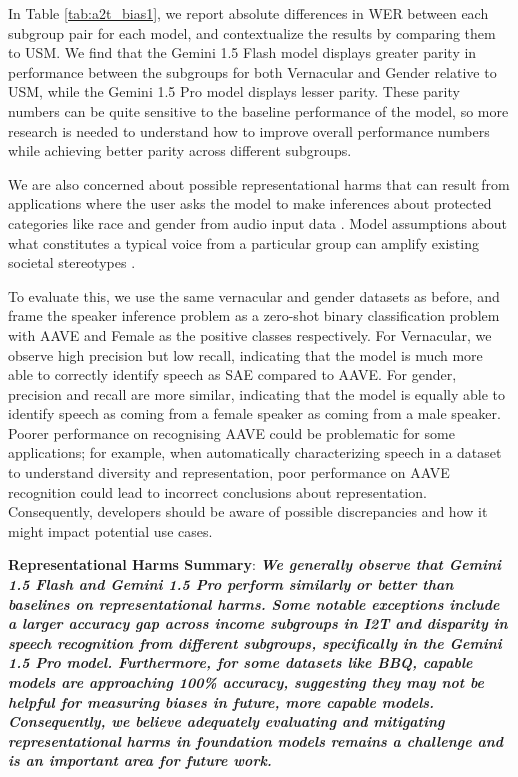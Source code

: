 In Table \ref{tab:a2t_bias1}, we report absolute differences in WER between each subgroup pair for each model, and contextualize the results by comparing them to USM. We find that the Gemini 1.5 Flash model displays greater parity in performance between the subgroups for both Vernacular and Gender relative to USM, while the Gemini 1.5 Pro model displays lesser parity. These parity numbers can be quite sensitive to the baseline performance of the model, so more research is needed to understand how to improve overall performance numbers while achieving better parity across different subgroups.

We are also concerned about possible representational harms that can result from applications where the user asks the model to make inferences about protected categories like race and gender from audio input data \citep{weidinger2021ethical}. Model assumptions about what constitutes a typical voice from a particular group can amplify existing societal stereotypes \citep{buolamwini2018gender}.

To evaluate this, we use the same vernacular and gender datasets as before, and frame the speaker inference problem as a zero-shot binary classification problem with AAVE and Female as the positive classes respectively. For Vernacular, we observe high precision but low recall, indicating that the model is much more able to correctly identify speech as SAE compared to AAVE. For gender, precision and recall are more similar, indicating that the model is equally able to identify speech as coming from a female speaker as coming from a male speaker.  Poorer performance on recognising AAVE could be problematic for some applications; for example, when automatically characterizing speech in a dataset to understand diversity and representation, poor performance on AAVE recognition could lead to incorrect conclusions about representation.  Consequently, developers should be aware of possible discrepancies and how it might impact potential use cases.

{\textbf{Representational Harms Summary}}: \textbf{\emph{We generally observe that Gemini 1.5 Flash and Gemini 1.5 Pro perform similarly or better than baselines on representational harms.  Some notable exceptions include a larger accuracy gap across income subgroups in I2T and disparity in speech recognition from different subgroups, specifically in the Gemini 1.5 Pro model.  Furthermore, for some datasets like BBQ, capable models are approaching 100\% accuracy, suggesting they may not be helpful for measuring biases in future, more capable models.  Consequently, we believe adequately evaluating and mitigating representational harms in foundation models remains a challenge and is an important area for future work.}}

